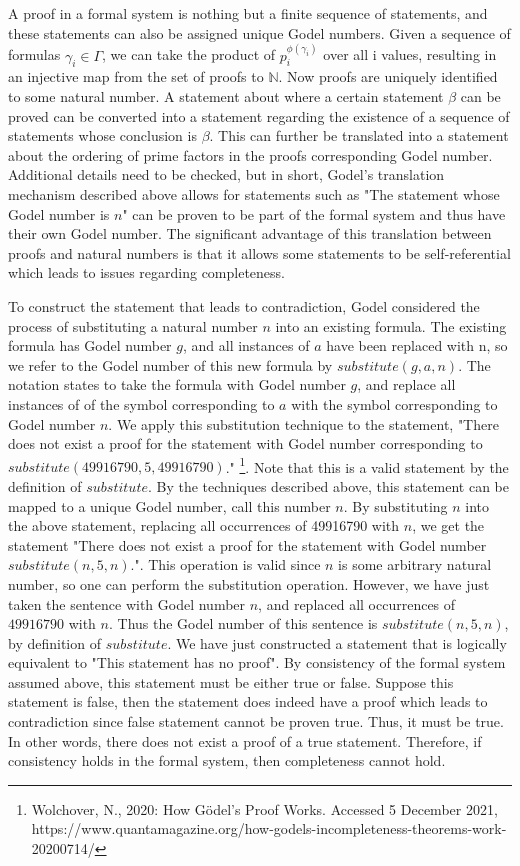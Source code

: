 \documentclass[%
 reprint,
 amsmath,amssymb,
 aps,
]{revtex4-2}
\begin{document}
A proof in a formal system is nothing but a finite sequence of statements, and these statements can also be assigned unique Godel numbers.  Given a sequence of formulas $\gamma_i \in \Gamma$, we can take the product of $p_i^{\phi(\gamma_i)}$ over all i values, resulting in an injective map from the set of proofs to $\mathbb{N}$.  Now proofs are uniquely identified to some natural number.  A statement about where a certain statement $\beta$ can be proved can be converted into a statement regarding the existence of a sequence of statements whose conclusion is $\beta$.  This can further be translated into a statement about the ordering of prime factors in the proofs corresponding Godel number.  Additional details need to be checked, but in short, Godel's translation mechanism described above allows for statements such as "The statement whose Godel number is $n$" can be proven to be part of the formal system and thus have their own Godel number.  The significant advantage of this translation between proofs and natural numbers is that it allows some statements to be self-referential which leads to issues regarding completeness.  

To construct the statement that leads to contradiction, Godel considered the process of substituting a natural number $n$ into an existing formula.  The existing formula has Godel number $g$, and all instances of $a$ have been replaced with n, so we refer to the Godel number of this new formula by $substitute(g, a, n)$.  The notation states to take the formula with Godel number $g$, and replace all instances of of the symbol corresponding to $a$ with the symbol corresponding to Godel number $n$.  We apply this substitution technique to the statement,
"There does not exist a proof for the statement with Godel number corresponding to $substitute(49916790, 5, 49916790)$."
\footnote{Wolchover, N., 2020: How Gödel’s Proof Works. Accessed 5 December 2021, https://www.quantamagazine.org/how-godels-incompleteness-theorems-work-20200714/ }.  Note that this is a valid statement by the definition of $substitute$.  By the techniques described above, this statement can be mapped to a unique Godel number, call this number $n$.  By substituting $n$ into the above statement, replacing all occurrences of 49916790 with $n$, we get the statement "There does not exist a proof for the statement with Godel number $substitute(n, 5, n)$.".  This operation is valid since $n$ is some arbitrary natural number, so one can perform the substitution operation.  However, we have just taken the sentence with Godel number $n$, and replaced all occurrences of $49916790$ with $n$.  Thus the Godel number of this sentence is $substitute(n, 5, n)$, by definition of $substitute$.  We have just constructed a statement that is logically equivalent to "This statement has  no proof".  By consistency of the formal system assumed above, this statement must be either true or false.  Suppose this statement is false, then the statement does indeed have a proof which leads to contradiction since false statement cannot be proven true.  Thus, it must be true.  In other words, there does not exist a proof of a true statement.  Therefore, if consistency holds in the formal system, then completeness cannot hold.   
\end{document}
